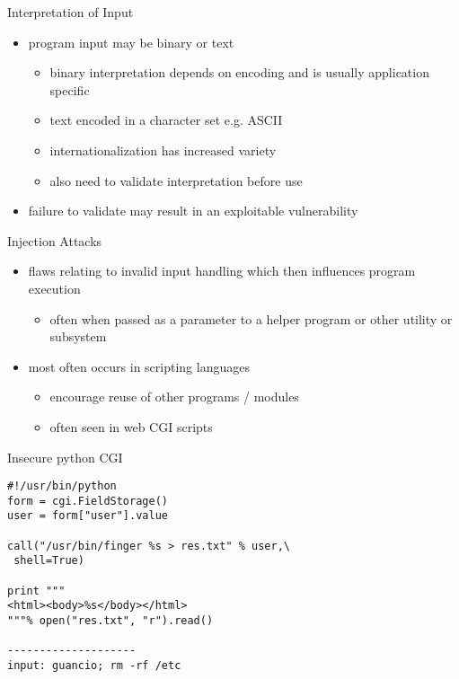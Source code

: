 \documentclass{beamer}
\begin{document}
\begin{frame}{Interpretation of Input}
  \begin{itemize}
  \item program input may be binary or text
    \begin{itemize}
    \item binary interpretation depends on encoding and is
      usually application specific
    \item text encoded in a character set e.g. ASCII
    \item internationalization has increased variety
    \item also need to validate interpretation before use
    \end{itemize}
  \item failure to validate may result in an exploitable
vulnerability
  \end{itemize}
\end{frame}


\begin{frame}{Injection Attacks}
  \begin{itemize}
  \item flaws relating to invalid input handling which
then influences program execution
    \begin{itemize}
    \item often when passed as a parameter to a helper
program or other utility or subsystem
    \end{itemize}
  \item most often occurs in scripting languages
    \begin{itemize}
    \item encourage reuse of other programs / modules
    \item often seen in web CGI scripts
    \end{itemize}
  \end{itemize}
\end{frame}

\begin{frame}[fragile]{Insecure python CGI}
  \begin{verbatim}
#!/usr/bin/python
form = cgi.FieldStorage()
user = form["user"].value

call("/usr/bin/finger %s > res.txt" % user,\
 shell=True)

print """
<html><body>%s</body></html>
"""% open("res.txt", "r").read()

--------------------
input: guancio; rm -rf /etc
  \end{verbatim}
  
\end{frame}
\end{document}
